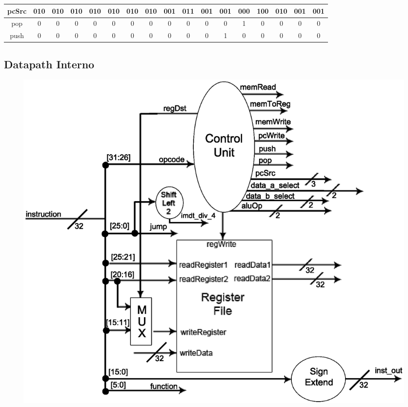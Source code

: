 \begin{center}
\begin{longtable}[pos]{| c | c | c | c | c | c | c | c | c | c | c | c | c | c | c | c | c |}
            \small pcSrc 			& \small 010 & \small 010   & \small 010 & \small 010 & \small 010 & \small 010 & \small 010 & \small 001 & \small 011 & \small 001 & \small 001 & \small 000 & \small 100 & \small 010 & \small 001& \small 001\\ \hline
            
            \small pop 				& 0   & 0   & 0   & 0   & 0   & 0   & 0   & 0   & 0   & 0   & 0   & 1   & 0  & 0 & 0 & 0\\ \hline
            \small push 			& 0   & 0   & 0   & 0   & 0   & 0   & 0   & 0   & 0   & 0   & 1   & 0   & 0  & 0 & 0 & 0\\ \hline

		\end{longtable}
	\end{center}
   
   \newpage
	
	\subsection{Datapath Interno}
	
	\begin{figure}[h!]
		\begin{center}
		\includegraphics[scale=0.8]{./datapath/stage2.eps}
		\end{center}
	\end{figure}